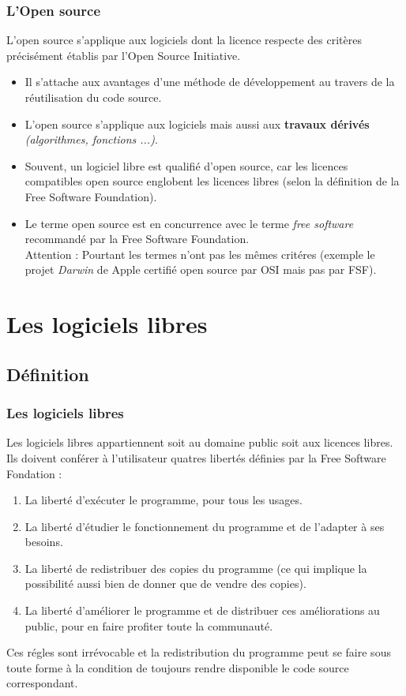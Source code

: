 \documentclass{beamer}
\begin{document}
\begin{frame}
	\frametitle{L'Open source}
	L'open source s'applique aux logiciels dont la licence respecte des critères précisément établis par l'Open Source Initiative.
	\pause
	\begin{itemize}
		\item\footnotesize Il s'attache aux avantages d'une méthode de développement au travers de la réutilisation du code source. 
		\pause
		\item\footnotesize L'open source s'applique aux logiciels mais aussi aux \textbf{travaux dérivés} \textit{(algorithmes, fonctions ...)}.
		\pause
		\item\footnotesize Souvent, un logiciel libre est qualifié d'open source, car les licences compatibles open source englobent les licences libres (selon la définition de la Free Software Foundation).
		\pause
		\item\footnotesize Le terme open source est en concurrence avec le terme \textit{free software} recommandé par la Free Software Foundation.\\
		Attention : Pourtant les termes n'ont pas les mêmes critéres (exemple le projet \textit{Darwin} de Apple certifié open source par OSI mais pas par FSF).
	\end{itemize}
\end{frame}

\section[Les logiciels libres]{Les logiciels libres}
\subsection[Définition]{Définition}

\begin{frame}
	\frametitle{Les logiciels libres}
	Les logiciels libres appartiennent soit au domaine public soit aux licences libres. Ils doivent conférer à l'utilisateur quatres libertés définies par la Free Software Fondation :
	\begin{enumerate}
		\pause
		\item\footnotesize La liberté d'exécuter le programme, pour tous les usages.
		\pause
		\item\footnotesize La liberté d'étudier le fonctionnement du programme et de l'adapter à ses besoins.
		\pause
		\item\footnotesize La liberté de redistribuer des copies du programme (ce qui implique la possibilité aussi bien de donner que de vendre des copies).
		\pause
		\item\footnotesize La liberté d'améliorer le programme et de distribuer ces améliorations au public, pour en faire profiter toute la communauté.
	\end{enumerate}
	\pause
	Ces régles sont irrévocable et la redistribution du programme peut se faire sous toute forme à la condition de toujours rendre disponible le code source correspondant.
\end{frame}
\end{document}
